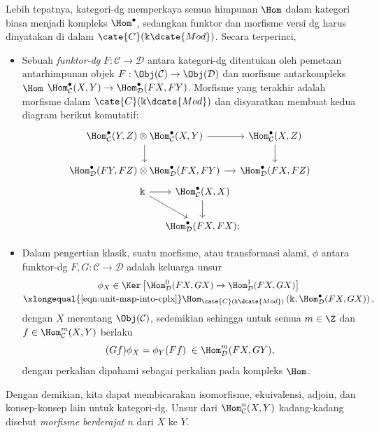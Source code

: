 Lebih tepatnya, kategori-dg memperkaya semua himpunan $\Hom$ dalam kategori
biasa menjadi kompleks $\Hom^\bullet$, sedangkan funktor dan morfisme versi
dg harus dinyatakan di dalam $\cate{C}(\Bbbk\dcate{Mod})$. Secara terperinci,
\begin{itemize}
	\item Sebuah \emph{funktor-dg} $F:\mathcal{C}\to\mathcal{D}$ antara
	kategori-dg ditentukan oleh pemetaan antarhimpunan objek
	$F:\Obj(\mathcal{C})\to\Obj(\mathcal{D})$ dan morfisme antarkompleks
	$\Hom$
	$\Hom^\bullet_{\mathcal{C}}(X,Y)\to
	\Hom^\bullet_{\mathcal{D}}(FX,FY)$. Morfisme yang terakhir adalah morfisme
	dalam $\cate{C}(\Bbbk\dcate{Mod})$ dan disyaratkan membuat kedua diagram
	berikut komutatif:
	\begin{equation*}\begin{gathered}
		\begin{tikzcd}[column sep=small]
			\Hom_{\mathcal{C}}^\bullet(Y, Z) \otimes \Hom_{\mathcal{C}}^\bullet(X, Y) \arrow[r] \arrow[d] & \Hom_{\mathcal{C}}^\bullet(X, Z) \arrow[d] \\
			\Hom_{\mathcal{D}}^\bullet(FY, FZ) \otimes \Hom_{\mathcal{D}}^\bullet(FX, FY) \arrow[r] & \Hom_{\mathcal{D}}^\bullet(FX, FZ)
		\end{tikzcd} \\
		\begin{tikzcd}[column sep=small]
			\Bbbk \arrow[r] \arrow[rd] & \Hom_{\mathcal{C}}^\bullet(X, X) \arrow[d] \\
			& \Hom_{\mathcal{D}}^\bullet(FX, FX) ;
		\end{tikzcd}
	\end{gathered}\end{equation*}
	\item Dalam pengertian klasik, suatu morfisme, atau transformasi alami,
	$\phi$ antara funktor-dg $F,G:\mathcal{C}\to\mathcal{D}$ adalah keluarga
	unsur
	\begin{multline*}
		\phi_X \in \Ker\left[ \Hom_{\mathcal{D}}^0(FX, GX) \to \Hom_{\mathcal{D}}^1(FX, GX) \right] \\
		\xlongequal{\text{\eqref{eqn:unit-map-into-cplx}}} \Hom_{\cate{C}(\Bbbk\dcate{Mod})}\left(\Bbbk, \Hom_{\mathcal{D}}^\bullet(FX, GX) \right) ,
	\end{multline*}
	dengan $X$ merentang $\Obj(\mathcal{C})$, sedemikian sehingga untuk
	semua $m\in\Z$ dan $f\in\Hom_{\mathcal{C}}^m(X,Y)$ berlaku
	\[ (Gf) \phi_X = \phi_Y (Ff) \; \in \Hom_{\mathcal{D}}^m(FX, GY), \]
	dengan perkalian dipahami sebagai perkalian pada kompleks $\Hom$.
\end{itemize}
Dengan demikian, kita dapat membicarakan isomorfisme, ekuivalensi, adjoin,
dan konsep-konsep lain untuk kategori-dg. Unsur dari
$\Hom^n_{\mathcal{C}}(X,Y)$ kadang-kadang disebut \emph{morfisme berderajat
$n$} dari $X$ ke $Y$.

